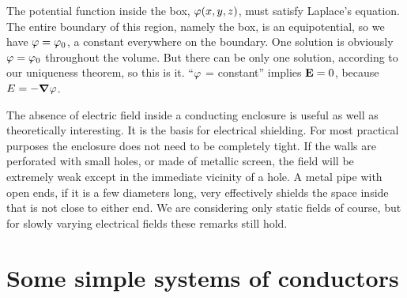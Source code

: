 The potential function inside the box, $\varphi(x,y,z)$, must satisfy
Laplace's equation. The entire boundary of this region, namely the
box, is an equipotential, so we have $\varphi=\varphi_0$, a constant everywhere
on the boundary. One solution is obviously $\varphi=\varphi_0$ throughout
the volume. But there can be only one solution, according to our
uniqueness theorem, so this is it. ``$\varphi$ = constant'' implies $\mathbf{E} = 0$,
because $E = -\boldsymbol{\nabla} \varphi$.

The absence of electric field inside a conducting enclosure is useful
as well as theoretically interesting. It is the basis for electrical
shielding. For most practical purposes the enclosure does not need
to be completely tight. If the walls are perforated with small holes,
or made of metallic screen, the field will be extremely weak except
in the immediate vicinity of a hole. A metal pipe with open ends,
if it is a few diameters long, very effectively shields the space inside
that is not close to either end. We are considering only static fields
of course, but for slowly varying electrical fields these remarks still
hold.

\section{Some simple systems of conductors}

